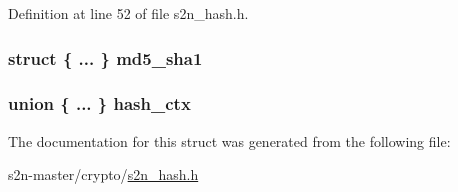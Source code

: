Definition at line 52 of file s2n\+\_\+hash.\+h.

\subsubsection[{\texorpdfstring{md5\+\_\+sha1}{md5_sha1}}]{\setlength{\rightskip}{0pt plus 5cm}struct \{ ... \}   md5\+\_\+sha1}\hypertarget{structs2n__hash__state_a97658b28586dec6ff7e92d6c0ddeef79}{}\label{structs2n__hash__state_a97658b28586dec6ff7e92d6c0ddeef79}
\subsubsection[{\texorpdfstring{hash\+\_\+ctx}{hash_ctx}}]{\setlength{\rightskip}{0pt plus 5cm}union \{ ... \}   hash\+\_\+ctx}\hypertarget{structs2n__hash__state_a781f1aca322cce1df06d477daf4151c5}{}\label{structs2n__hash__state_a781f1aca322cce1df06d477daf4151c5}


The documentation for this struct was generated from the following file\+:\begin{DoxyCompactItemize}
\item 
s2n-\/master/crypto/\hyperlink{s2n__hash_8h}{s2n\+\_\+hash.\+h}\end{DoxyCompactItemize}
